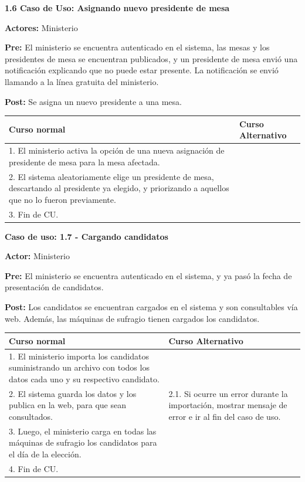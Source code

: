 \textbf{1.6 Caso de Uso: Asignando nuevo presidente de mesa}

\textbf{Actores:} Ministerio 

\textbf{Pre:} El ministerio se encuentra autenticado en el sistema, las mesas y los presidentes de mesa se encuentran publicados, y un presidente de mesa envió una notificación explicando que no puede estar presente. La notificación se envió llamando a la línea gratuita del ministerio.

\textbf{Post:} Se asigna un nuevo presidente a una mesa.
\begin{table}[h!]
	
 \begin{tabular}{|p{7.5cm} | p{7.5cm}|} 
 \hline
 \textbf{Curso normal} & \textbf{Curso Alternativo} \\
 \hline

1. El ministerio activa la opción de una nueva asignación de presidente de mesa para la mesa afectada. & \\
\hline

2.  El sistema aleatoriamente elige un presidente de mesa, descartando al presidente ya elegido, y priorizando a aquellos que no lo fueron previamente. & \\
\hline


3. Fin de CU. & \\
\hline



 \end{tabular}

\end{table}

\textbf{Caso de uso: 1.7 - Cargando candidatos}

\textbf{Actor:} Ministerio

\textbf{Pre:} El ministerio se encuentra autenticado en el sistema, y ya pasó la fecha de presentación de candidatos.

\textbf{Post:} Los candidatos se encuentran cargados en el sistema y son consultables vía web. Además, las máquinas de sufragio tienen cargados los candidatos.
\begin{table}[h!]
	
 \begin{tabular}{|p{7.5cm} | p{7.5cm}|} 
 \hline
 \textbf{Curso normal} & \textbf{Curso Alternativo} \\
 \hline
1. El ministerio importa los candidatos suministrando un archivo con todos los datos cada uno y su respectivo candidato. & \\
\hline

2. El sistema guarda los datos y los publica en la web, para que sean consultados. &
2.1. Si ocurre un error durante la importación, mostrar mensaje de error e ir al fin del caso de uso. \\
\hline
3. Luego, el ministerio carga en todas las máquinas de sufragio los candidatos para el día de la elección. & \\
\hline

4. Fin de CU. & \\
\hline
\end{tabular}
\end{table}

